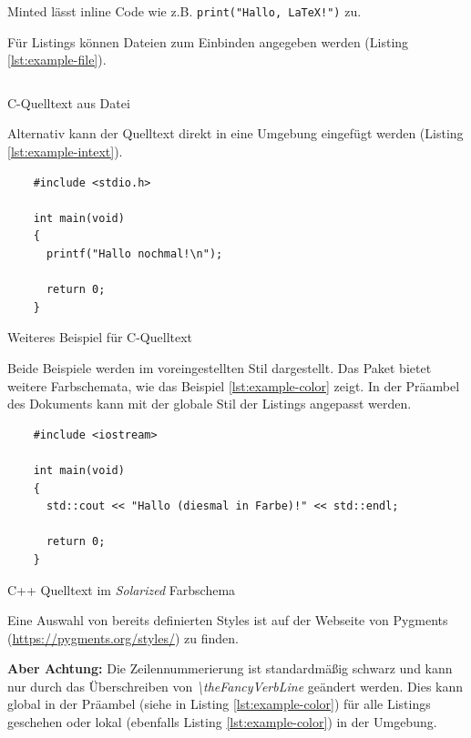 Minted lässt inline Code wie z.B. \texttt{print("Hallo, LaTeX!")} zu.

Für Listings können Dateien zum Einbinden angegeben werden (Listing \ref{lst:example-file}).

\begin{listing}[!htbp]
  \inputminted{c}{./anlagen/exampleCode.c}
  \caption{C-Quelltext aus Datei}
  \label{lst:example-file}
\end{listing}

Alternativ kann der Quelltext direkt in eine  Umgebung eingefügt werden (Listing \ref{lst:example-intext}).

\begin{listing}[!htbp]
  \begin{verbatim}
    #include <stdio.h>

    int main(void)
    {
      printf("Hallo nochmal!\n");

      return 0;
    }
  \end{verbatim}
  \caption{Weiteres Beispiel für C-Quelltext}
  \label{lst:example-intext}
\end{listing}

Beide Beispiele werden im voreingestellten Stil dargestellt.
Das Paket  bietet weitere Farbschemata, wie das Beispiel \ref{lst:example-color} zeigt.
In der Präambel des Dokuments kann mit \texttt{} der globale Stil der Listings angepasst werden.

\begin{listing}[!htbp]
  \renewcommand\theFancyVerbLine{%
    \rmfamily
    \textcolor[rgb]{0.7,0.7,0.7}{\tiny {\arabic{FancyVerbLine}}}%
  }
  \begin{verbatim}
    #include <iostream>

    int main(void)
    {
      std::cout << "Hallo (diesmal in Farbe)!" << std::endl;

      return 0;
    }
  \end{verbatim}
  \caption{C++ Quelltext im \textit{Solarized} Farbschema}
  \label{lst:example-color}
\end{listing}

Eine Auswahl von bereits definierten Styles ist auf der Webseite von Pygments (\url{https://pygments.org/styles/}) zu finden.

\textbf{Aber Achtung:} Die Zeilennummerierung ist standardmäßig schwarz und kann nur durch das Überschreiben von \textit{\textbackslash theFancyVerbLine} geändert werden.
Dies kann global in der Präambel (siehe  in Listing \ref{lst:example-color}) für alle Listings geschehen oder lokal (ebenfalls Listing \ref{lst:example-color}) in der  Umgebung.

